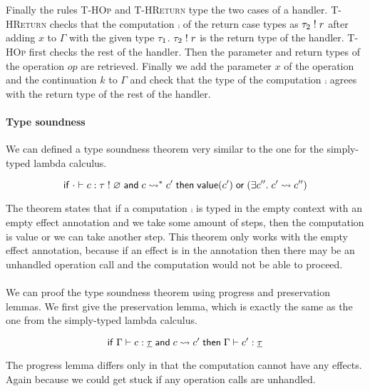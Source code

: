 {\\\\
Finally the rules \textsc{T-HOp} and \textsc{T-HReturn} type the two cases of a handler.
\textsc{T-HReturn} checks that the computation $\comp$ of the return case types as $\tau_2 \; ! \; r$ after adding $x$ to $\Gamma$ with the given type $\tau_1$. $\tau_2 \; ! \; r$ is the return type of the handler.
\textsc{T-HOp} first checks the rest of the handler. Then the parameter and return types of the operation $op$ are retrieved.
Finally we add the parameter $x$ of the operation and the continuation $k$ to $\Gamma$ and check that the type of the computation $\comp$ agrees with the return type of the rest of the handler.

\paragraph{Type soundness}
We can defined a type soundness theorem very similar to the one for the simply-typed lambda calculus.

\begin{theorem}
\[
	\mathsf{if}\;
		\cdot \vdash c : \tau \; ! \; \varnothing
		\;\mathsf{and}\;
		c \rightsquigarrow^* c'
	\;\mathsf{then}\;
		\mathsf{value}(c')
		\;\mathsf{or}\;
		(\exists c''.\; c' \rightsquigarrow c'')
\]
\end{theorem}

The theorem states that if a computation $\comp$ is typed in the empty context with an empty effect annotation and we take some amount of steps, then the computation is value or we can take another step.
This theorem only works with the empty effect annotation, because if an effect is in the annotation then there may be an unhandled operation call and the computation would not be able to proceed.
\\\\
We can proof the type soundness theorem using progress and preservation lemmas.
We first give the preservation lemma, which is exactly the same as the one from the simply-typed lambda calculus.

\begin{lemma}[Preservation]
\[
	\mathsf{if}\;
		\Gamma \vdash c : \underline{\tau}
		\;\mathsf{and}\;
		c \rightsquigarrow c'
	\;\mathsf{then}\;
		\Gamma \vdash c' : \underline{\tau}
\]
\end{lemma}

The progress lemma differs only in that the computation cannot have any effects.
Again because we could get stuck if any operation calls are unhandled.

}
